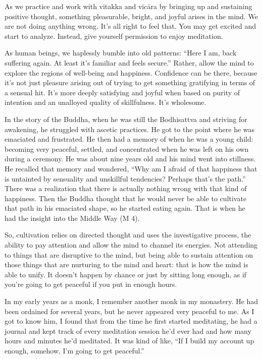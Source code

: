 As we practice and work with vitakka and vicāra by bringing up and
sustaining positive thought, something pleasurable, bright, and joyful
arises in the mind. We are not doing anything wrong. It’s all right to
feel that. You may get excited and start to analyze. Instead, give
yourself permission to enjoy meditation.

As human beings, we haplessly bumble into old patterns: “Here I am, back
suffering again. At least it’s familiar and feels secure.” Rather, allow
the mind to explore the regions of well-being and happiness. Confidence
can be there, because it’s not just pleasure arising out of trying to
get something gratifying in terms of a sensual hit. It’s more deeply
satisfying and joyful when based on purity of intention and an unalloyed
quality of skillfulness. It’s wholesome.

In the story of the Buddha, when he was still the Bodhisattva and
striving for awakening, he struggled with ascetic practices. He got to
the point where he was emaciated and frustrated. He then had a memory of
when he was a young child: becoming very peaceful, settled, and
concentrated when he was left on his own during a ceremony. He was about
nine years old and his mind went into stillness. He recalled that memory
and wondered, “Why am I afraid of that happiness that is untainted by
sensuality and unskillful tendencies? Perhaps that’s the path.” There
was a realization that there is actually nothing wrong with that kind of
happiness. Then the Buddha thought that he would never be able to
cultivate that path in his emaciated shape, so he started eating again.
That is when he had the insight into the Middle Way (M 4).

So, cultivation relies on directed thought and uses the investigative
process, the ability to pay attention and allow the mind to channel its
energies. Not attending to things that are disruptive to the mind, but
being able to sustain attention on those things that are nurturing to
the mind and heart: that is how the mind is able to unify. It doesn’t
happen by chance or just by sitting long enough, as if you’re going to
get peaceful if you put in enough hours.

In my early years as a monk, I remember another monk in my monastery. He
had been ordained for several years, but he never appeared very peaceful
to me. As I got to know him, I found that from the time he first started
meditating, he had a journal and kept track of every meditation session
he’d ever had and how many hours and minutes he’d meditated. It was kind
of like, “If I build my account up enough, somehow, I’m going to get
peaceful.”

